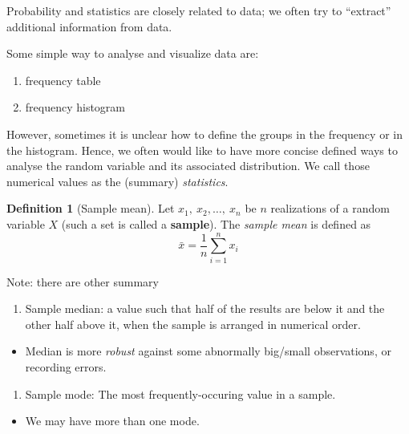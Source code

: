 \documentclass[
]{book}
\providecommand{\tightlist}{%
  \setlength{\itemsep}{0pt}\setlength{\parskip}{0pt}}
\theoremstyle{definition}
\newtheorem{definition}{Definition}[chapter]
\theoremstyle{definition}
\theoremstyle{definition}
\theoremstyle{definition}
\theoremstyle{remark}
\begin{document}
Probability and statistics are closely related to data; we often try to ``extract'' additional information from data.

Some simple way to analyse and visualize data are:

\begin{enumerate}
\def\labelenumi{\arabic{enumi}.}
\tightlist
\item
  frequency table
\item
  frequency histogram
\end{enumerate}

However, sometimes it is unclear how to define the groups in the frequency or in the histogram. Hence, we often would like to have more concise defined ways to analyse the random variable and its associated distribution. We call those numerical values as the (summary) \emph{statistics}.

\begin{definition}[Sample mean]
Let \(x_1, \ x_2, \ldots, \ x_n\) be \(n\) realizations of a random variable \(X\) (such a set is called a \textbf{sample}). The \emph{sample mean} is defined as
\[
\bar{x} = \frac{1}{n}  \sum_{i=1}^n x_i
\]
\end{definition}

Note: there are other summary

\begin{enumerate}
\def\labelenumi{\arabic{enumi}.}
\tightlist
\item
  Sample median: a value such that half of the results are below it and the other half above it, when the sample is arranged in numerical order.
\end{enumerate}

\begin{itemize}
\tightlist
\item
  Median is more \emph{robust} against some abnormally big/small observations, or recording errors.
\end{itemize}

\begin{enumerate}
\def\labelenumi{\arabic{enumi}.}
\setcounter{enumi}{1}
\tightlist
\item
  Sample mode: The most frequently-occuring value in a sample.
\end{enumerate}

\begin{itemize}
\tightlist
\item
  We may have more than one mode.
\end{itemize}
\end{document}
